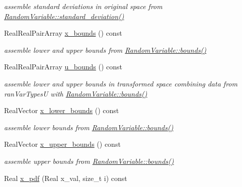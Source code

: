 \begin{DoxyCompactItemize}
\begin{DoxyCompactList}\small\item\em assemble standard deviations in original space from \hyperlink{classPecos_1_1RandomVariable_a6a4ed9624d511f8a4e4f509c82cb0706}{Random\+Variable\+::standard\+\_\+deviation()} \end{DoxyCompactList}\item 
Real\+Real\+Pair\+Array \hyperlink{classPecos_1_1ProbabilityTransformation_a942d8fa30784a306612a5bbb8ba26618}{x\+\_\+bounds} () const \label{classPecos_1_1ProbabilityTransformation_a942d8fa30784a306612a5bbb8ba26618}

\begin{DoxyCompactList}\small\item\em assemble lower and upper bounds from \hyperlink{classPecos_1_1RandomVariable_a4bdb95a8fa5fffaa0de5102f56963cf2}{Random\+Variable\+::bounds()} \end{DoxyCompactList}\item 
Real\+Real\+Pair\+Array \hyperlink{classPecos_1_1ProbabilityTransformation_a3adb697225aab41e77b89be772c752f2}{u\+\_\+bounds} () const \label{classPecos_1_1ProbabilityTransformation_a3adb697225aab41e77b89be772c752f2}

\begin{DoxyCompactList}\small\item\em assemble lower and upper bounds in transformed space combining data from ran\+Var\+TypesU with \hyperlink{classPecos_1_1RandomVariable_a4bdb95a8fa5fffaa0de5102f56963cf2}{Random\+Variable\+::bounds()} \end{DoxyCompactList}\item 
Real\+Vector \hyperlink{classPecos_1_1ProbabilityTransformation_a5110500ac6a7cabc1c6006f28ce5a859}{x\+\_\+lower\+\_\+bounds} () const \label{classPecos_1_1ProbabilityTransformation_a5110500ac6a7cabc1c6006f28ce5a859}

\begin{DoxyCompactList}\small\item\em assemble lower bounds from \hyperlink{classPecos_1_1RandomVariable_a4bdb95a8fa5fffaa0de5102f56963cf2}{Random\+Variable\+::bounds()} \end{DoxyCompactList}\item 
Real\+Vector \hyperlink{classPecos_1_1ProbabilityTransformation_aebc8694b3cb2100991fd838cd00d7714}{x\+\_\+upper\+\_\+bounds} () const \label{classPecos_1_1ProbabilityTransformation_aebc8694b3cb2100991fd838cd00d7714}

\begin{DoxyCompactList}\small\item\em assemble upper bounds from \hyperlink{classPecos_1_1RandomVariable_a4bdb95a8fa5fffaa0de5102f56963cf2}{Random\+Variable\+::bounds()} \end{DoxyCompactList}\item 
Real \hyperlink{classPecos_1_1ProbabilityTransformation_a959eee828507b07c4a4b19bd352e2719}{x\+\_\+pdf} (Real x\+\_\+val, size\+\_\+t i) const \label{classPecos_1_1ProbabilityTransformation_a959eee828507b07c4a4b19bd352e2719}


\end{DoxyCompactItemize}
